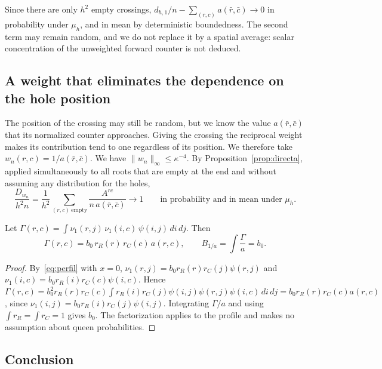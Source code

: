 Since there are only $h^2$ empty crossings, $d_{h,1}/n-\sum_{(r,c)}a(\bar r,\bar c)\to0$ in probability
under $\mu_h$, and in mean by
deterministic boundedness. The second term may remain random, and we do not replace it by a spatial average:
scalar concentration of the unweighted forward counter is not deduced.

\subsection{A weight that eliminates the dependence on the hole position}

The position of the crossing may still be random, but we know the value $a(\bar r,\bar c)$ that its
normalized counter approaches.
Giving the crossing the reciprocal weight makes its contribution tend to one regardless of its position. We
therefore take
$w_n(r,c)=1/a(\bar r,\bar c)$. We have $\|w_n\|_\infty\le\kappa^{-4}$. By Proposition~\ref{prop:directa},
applied simultaneously to all
roots that are empty at the end and without assuming any distribution for the holes,
\begin{equation}\label{eq:directa_ponderada}
 \frac{D_{w_n}}{h^2n}=\frac1{h^2}\sum_{(r,c)\ \text{empty}}\frac{A^{rc}}{n\,a(\bar r,\bar c)}
 \longrightarrow1\qquad\text{in probability and in mean under }\mu_h .
\end{equation}

\begin{lema}\label{lem:nucleo} Let
$\Gamma(r,c)=\int\nu_1(r,j)\,\nu_1(i,c)\,\psi(i,j)\,di\,dj$. Then \[
 \Gamma(r,c)=b_0\,r_R(r)\,r_C(c)\,a(r,c),\qquad B_{1/a}=\int\frac\Gamma a=b_0 .
\] \end{lema}

\begin{proof} By~\eqref{eq:perfil} with $x=0$, $\nu_1(r,j)=b_0r_R(r)r_C(j)\psi(r,j)$ and
$\nu_1(i,c)=b_0r_R(i)r_C(c)\psi(i,c)$. Hence
$\Gamma(r,c)=b_0^2r_R(r)r_C(c)\int r_R(i)r_C(j)\psi(i,j)\psi(r,j)\psi(i,c)\,di\,dj
=b_0r_R(r)r_C(c)a(r,c)$, since $\nu_1(i,j)=b_0r_R(i)r_C(j)\psi(i,j)$. Integrating $\Gamma/a$ and using $\int
r_R=\int r_C=1$ gives
$b_0$. The factorization applies to the profile and makes no assumption about queen probabilities.
\end{proof}

\subsection{Conclusion}

